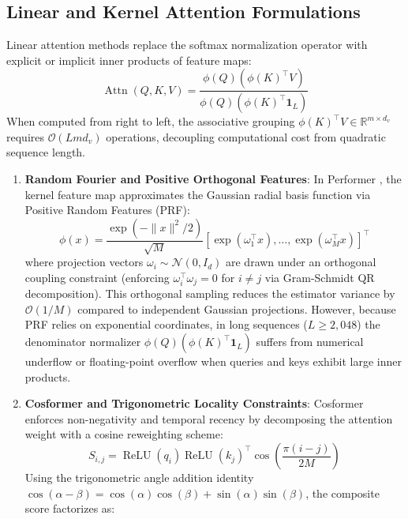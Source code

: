 \documentclass{article}
\begin{document}
\subsection{Linear and Kernel Attention Formulations}
Linear attention methods replace the softmax normalization operator with explicit or implicit inner products of feature maps:
\begin{equation}
    \operatorname{Attn}(Q, K, V) = \frac{\phi(Q) (\phi(K)^\top V)}{\phi(Q) (\phi(K)^\top \mathbf{1}_L)}
\end{equation}
When computed from right to left, the associative grouping $\phi(K)^\top V \in \mathbb{R}^{m \times d_v}$ requires $\mathcal{O}(L m d_v)$ operations, decoupling computational cost from quadratic sequence length.
\begin{enumerate}
    \item \textbf{Random Fourier and Positive Orthogonal Features}:
    In Performer \citep{choromanski2021rethinking}, the kernel feature map approximates the Gaussian radial basis function via Positive Random Features (PRF):
    \begin{equation}
        \phi(x) = \frac{\exp(-\|x\|^2 / 2)}{\sqrt{M}} \left[ \exp(\omega_1^\top x), \dots, \exp(\omega_M^\top x) \right]^\top
    \end{equation}
    where projection vectors $\omega_i \sim \mathcal{N}(0, I_d)$ are drawn under an orthogonal coupling constraint (enforcing $\omega_i^\top \omega_j = 0$ for $i \ne j$ via Gram-Schmidt QR decomposition). This orthogonal sampling reduces the estimator variance by $\mathcal{O}(1/M)$ compared to independent Gaussian projections. However, because PRF relies on exponential coordinates, in long sequences ($L \ge 2,048$) the denominator normalizer $\phi(Q) (\phi(K)^\top \mathbf{1}_L)$ suffers from numerical underflow or floating-point overflow when queries and keys exhibit large inner products.
    \item \textbf{Cosformer and Trigonometric Locality Constraints}:
    Cosformer \citep{qin2022cosformer} enforces non-negativity and temporal recency by decomposing the attention weight with a cosine reweighting scheme:
    \begin{equation}
        S_{i, j} = \operatorname{ReLU}(q_i) \operatorname{ReLU}(k_j)^\top \cos\left(\frac{\pi (i - j)}{2 M}\right)
    \end{equation}
    Using the trigonometric angle addition identity $\cos(\alpha - \beta) = \cos(\alpha)\cos(\beta) + \sin(\alpha)\sin(\beta)$, the composite score factorizes as:
    \begin{equation}

\end{equation}
\end{enumerate}
\end{document}
